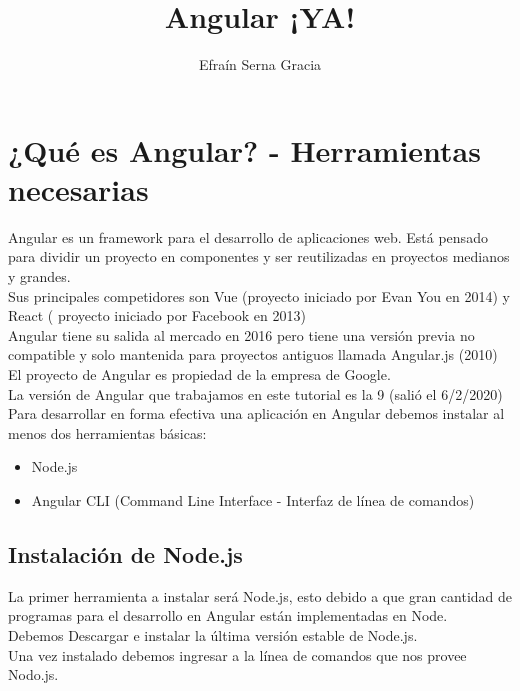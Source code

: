 \documentclass[12pt]{book} %
\title{Angular ¡YA!}
\author{Efraín Serna Gracia}
\begin{document}
\maketitle
\tableofcontents
\chapter{¿Qué es Angular? - Herramientas necesarias}
Angular es un framework para el desarrollo de aplicaciones web. Está pensado para dividir un proyecto en componentes y ser reutilizadas en proyectos medianos y grandes.\\

Sus principales competidores son Vue (proyecto iniciado por Evan You en 2014) y React ( proyecto iniciado por Facebook en 2013)\\

Angular tiene su salida al mercado en 2016 pero tiene una versión previa no compatible y solo mantenida para proyectos antiguos llamada Angular.js (2010)\\

El proyecto de Angular es propiedad de la empresa de Google.\\

La versión de Angular que trabajamos en este tutorial es la 9 (salió el 6/2/2020)\\

Para desarrollar en forma efectiva una aplicación en Angular debemos instalar al menos dos herramientas básicas:\\
\begin{itemize}
\item Node.js
\item Angular CLI (Command Line Interface - Interfaz de línea de comandos)
\end{itemize}

\section{Instalación de Node.js}
La primer herramienta a instalar será Node.js, esto debido a que gran cantidad de programas para el desarrollo en Angular están implementadas en Node.\\

Debemos Descargar e instalar la última versión estable de Node.js.\\

Una vez instalado debemos ingresar a la línea de comandos que nos provee Nodo.js.\\
\end{document}
